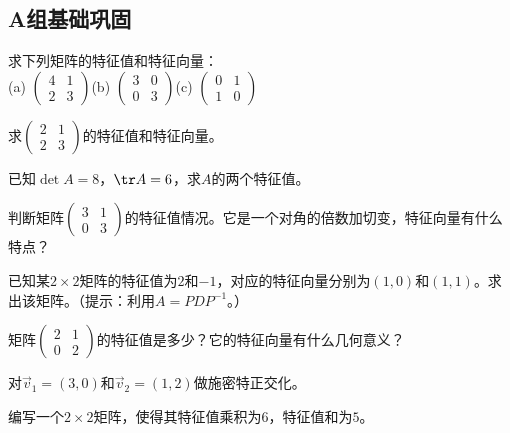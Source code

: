 \subsection*{A组\quad 基础巩固}
\begin{exercise}
\item 求下列矩阵的特征值和特征向量：\\
(a) $\begin{pmatrix}4&1\\2&3\end{pmatrix}$\quad (b) $\begin{pmatrix}3&0\\0&3\end{pmatrix}$\quad (c) $\begin{pmatrix}0&1\\1&0\end{pmatrix}$
\item 求$\begin{pmatrix}2&1\\2&3\end{pmatrix}$的特征值和特征向量。
\item 已知$\det A=8$，$\tr A=6$，求$A$的两个特征值。
\item 判断矩阵$\begin{pmatrix}3&1\\0&3\end{pmatrix}$的特征值情况。它是一个对角的倍数加切变，特征向量有什么特点？
\item 已知某$2\times2$矩阵的特征值为$2$和$-1$，对应的特征向量分别为$(1,0)$和$(1,1)$。求出该矩阵。（提示：利用$A=PDP^{-1}$。）
\item 矩阵$\begin{pmatrix}2&1\\0&2\end{pmatrix}$的特征值是多少？它的特征向量有什么几何意义？
\item 对$\vec v_1=(3,0)$和$\vec v_2=(1,2)$做施密特正交化。
\item 编写一个$2\times2$矩阵，使得其特征值乘积为$6$，特征值和为$5$。
\end{exercise}

